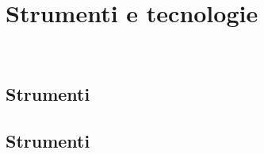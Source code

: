 \chapter{Strumenti e tecnologie}
\label{cap:strumenti-tecnologie}

\\

\section{Strumenti}


\section{Strumenti}

